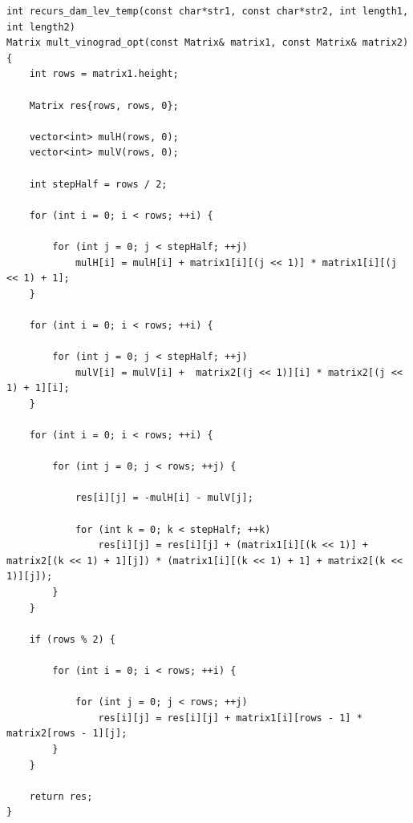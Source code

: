 \begin{lstlisting}[caption=Оптимизированный алгоритм Винограда]
int recurs_dam_lev_temp(const char*str1, const char*str2, int length1, int length2)
Matrix mult_vinograd_opt(const Matrix& matrix1, const Matrix& matrix2)
{
    int rows = matrix1.height;

    Matrix res{rows, rows, 0};

    vector<int> mulH(rows, 0);
    vector<int> mulV(rows, 0);

    int stepHalf = rows / 2;

    for (int i = 0; i < rows; ++i) {

        for (int j = 0; j < stepHalf; ++j) 
            mulH[i] = mulH[i] + matrix1[i][(j << 1)] * matrix1[i][(j << 1) + 1]; 
    }

    for (int i = 0; i < rows; ++i) {

        for (int j = 0; j < stepHalf; ++j) 
            mulV[i] = mulV[i] +  matrix2[(j << 1)][i] * matrix2[(j << 1) + 1][i];
    }

    for (int i = 0; i < rows; ++i) {

        for (int j = 0; j < rows; ++j) {
            
            res[i][j] = -mulH[i] - mulV[j];

            for (int k = 0; k < stepHalf; ++k) 
                res[i][j] = res[i][j] + (matrix1[i][(k << 1)] + matrix2[(k << 1) + 1][j]) * (matrix1[i][(k << 1) + 1] + matrix2[(k << 1)][j]);
        }
    }

    if (rows % 2) {

        for (int i = 0; i < rows; ++i) {

            for (int j = 0; j < rows; ++j) 
                res[i][j] = res[i][j] + matrix1[i][rows - 1] * matrix2[rows - 1][j];
        }
    }

    return res;   
}
\end{lstlisting}
\clearpage
